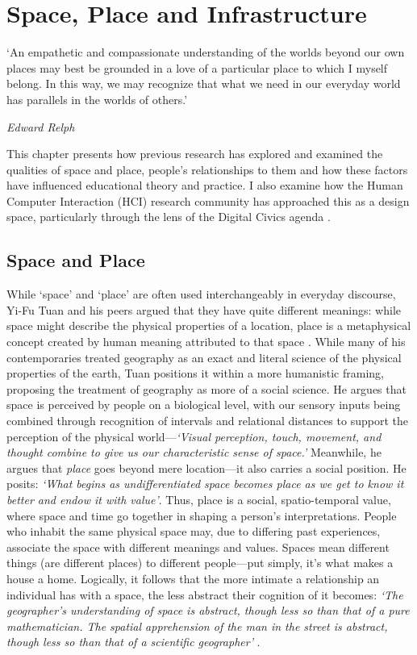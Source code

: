 \chapter{Space, Place and Infrastructure}
\label{chap:SpacePlaceInfrastructure}

\epigraph{`An empathetic and compassionate understanding of the worlds beyond our own places may best be grounded in a love of a particular place to which I myself belong. In this way, we may recognize that what we need in our everyday world has parallels in the worlds of others.'}{\textit{Edward Relph}}

This chapter presents how previous research has explored and examined the qualities of space and place, people's relationships to them and how these factors have influenced educational theory and practice. I also examine how the Human Computer Interaction (HCI) research community has approached this as a design space, particularly through the lens of the Digital Civics agenda \citep{Olivier2015}.

\section{Space and Place}
\label{sec:SpaceAndPlace}

While ‘space’ and ‘place’ are often used interchangeably in everyday discourse, Yi-Fu Tuan and his peers argued that they have quite different meanings: while space might describe the physical properties of a location, place is a metaphysical concept created by human meaning attributed to that space \citep{Tuan1978}. While many of his contemporaries treated geography as an exact and literal science of the physical properties of the earth, Tuan positions it within a more humanistic framing, proposing the treatment of geography as more of a social science. He argues that space is perceived by people on a biological level, with our sensory inputs being combined through recognition of intervals and relational distances to support the perception of the physical world---\textit{`Visual perception, touch, movement, and thought combine to give us our characteristic sense of space.'} Meanwhile, he argues that \textit{place} goes beyond mere location---it also carries a social position. He posits: \textit{`What begins as undifferentiated space becomes place as we get to know it better and endow it with value'}. Thus, place is a social, spatio-temporal value, where space and time go together in shaping a person's interpretations. People who inhabit the same physical space may, due to differing past experiences, associate the space with different meanings and values. Spaces mean different things (are different places) to different people---put simply, it's what makes a house a home. Logically, it follows that the more intimate a relationship an individual has with a space, the less abstract their cognition of it becomes: \textit{`The geographer's understanding of space is abstract, though less so than that of a pure mathematician. The spatial apprehension of the man in the street is abstract, though less so than that of a scientific geographer'} \citep{Tuan1978}.

